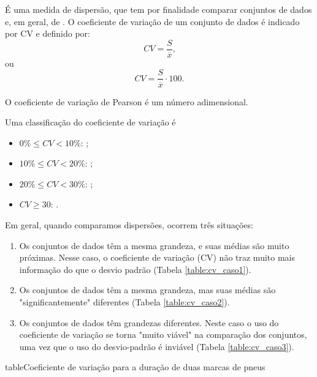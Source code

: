 \documentclass[11pt,fleqn]{book}
\numberwithin{mpicture}{chapter}
\numberwithin{mtable}{chapter}
\numberwithin{mframe}{chapter}
\begin{document}
É uma medida de dispersão, que tem por finalidade comparar conjuntos de dados  e, em geral, de . O coeficiente de variação de um conjunto de dados é indicado por CV e definido por:
\begin{equation}
	CV=\frac{S}{\overline{x}}\text{,}
\end{equation}
ou
\begin{equation}
	CV=\frac{S}{\overline{x}}\cdot 100\text{.}
\end{equation}

O coeficiente de variação de Pearson é um número adimensional.

Uma classificação do coeficiente de variação é
\begin{itemize}
	\item $0\%\leqslant CV < 10\%$: ;
	\item $10\%\leqslant CV < 20\%$: ;
	\item $20\%\leqslant CV < 30\%$: ;
	\item $CV \geqslant 30$: .
\end{itemize}

Em geral, quando comparamos dispersões, ocorrem três situações:

\begin{enumerate}
	\item Os conjuntos de dados têm a mesma grandeza, e suas médias são muito próximas. Nesse caso, o coeficiente de variação (CV) não traz muito mais informação do que o desvio padrão (Tabela \ref{table:cv_caso1}).
	
	\item Os conjuntos de dados têm a mesma grandeza, mas suas médias são "significantemente" diferentes (Tabela \ref{table:cv_caso2}).
	
	\item Os conjuntos de dados têm grandezas diferentes. Neste caso o uso do coeficiente de variação se torna "muito viável" na comparação dos conjuntos, uma vez que o uso do desvio-padrão é inviável (Tabela \ref{table:cv_caso3}).
\end{enumerate}

\begin{pageWidthArea}
	\begin{pageWidthAreaPicture}{table}{Coeficiente de variação para a duração de duas marcas de pneus}
		\label{table:cv_caso1}
	\end{pageWidthAreaPicture}
\end{pageWidthArea}
\end{document}
